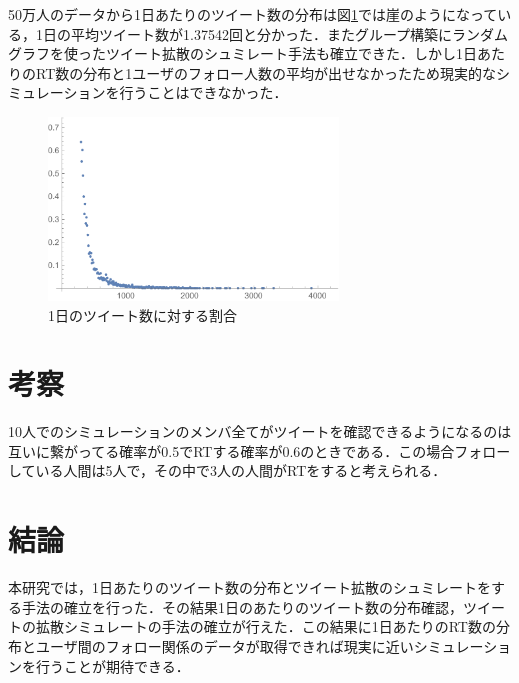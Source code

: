 \documentclass[uplatex,twocolumn,dvipdfmx]{jsarticle}
\begin{document}
50万人のデータから1日あたりのツイート数の分布は図\ref{ツイートの分布}では崖のようになっている，1日の平均ツイート数が1.37542回と分かった．またグループ構築にランダムグラフを使ったツイート拡散のシュミレート手法も確立できた．しかし1日あたりのRT数の分布と1ユーザのフォロー人数の平均が出せなかったため現実的なシミュレーションを行うことはできなかった．

\begin{figure}[htb]
\centering
\includegraphics[width=77mm,clip]{tweets.pdf}
\caption{1日のツイート数に対する割合}\label{ツイートの分布}
\end{figure}

\section{考察}

10人でのシミュレーションのメンバ全てがツイートを確認できるようになるのは互いに繋がってる確率が0.5でRTする確率が0.6のときである．この場合フォローしている人間は5人で，その中で3人の人間がRTをすると考えられる．

\section{結論}

本研究では，1日あたりのツイート数の分布とツイート拡散のシュミレートをする手法の確立を行った．その結果1日のあたりのツイート数の分布確認，ツイートの拡散シミュレートの手法の確立が行えた．この結果に1日あたりのRT数の分布とユーザ間のフォロー関係のデータが取得できれば現実に近いシミュレーションを行うことが期待できる．


\end{document}
